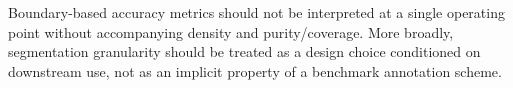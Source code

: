 \documentclass{article}
\begin{document}
Boundary-based accuracy metrics should not be interpreted at a single
operating point without accompanying density and purity/coverage.
More broadly, segmentation granularity should be treated as a design
choice conditioned on downstream use, not as an implicit property of a
benchmark annotation scheme.

\FloatBarrier
\clearpage

\appendix



\end{document}

